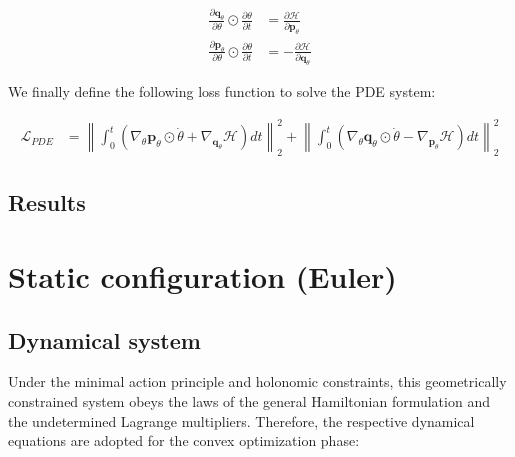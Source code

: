 \documentclass[draft]{agujournal2019}
\newcommand{\norm}[1]{\left\lVert#1\right\rVert}
\begin{document}
\begin{align}
    \frac{\partial \mathbf{q}_\theta}{\partial \theta} \odot \frac{\partial \theta}{\partial t} &= \frac{\partial \mathcal{H}}{\partial \mathbf{p}_\theta} \\
    \frac{\partial \mathbf{p}_\theta}{\partial \theta} \odot \frac{\partial \theta}{\partial t} &= - \frac{\partial \mathcal{H}}{\partial \mathbf{q}_\theta}
\end{align}

We finally define the following loss function to solve the PDE system:

\begin{align}
    \mathcal{L}_{PDE} &= \norm{\int_0^t \left(\nabla_\theta \mathbf{p}_\theta \odot \dot{\theta} + \nabla_{\mathbf{q}_\theta} \mathcal{H}\right) dt}_2^2 + \norm{\int_0^t \left(\nabla_\theta \mathbf{q}_\theta \odot \dot{\theta} - \nabla_{\mathbf{p}_\theta} \mathcal{H}\right) dt}^2_2
\end{align}

\subsection{Results}

\section{Static configuration (Euler)}
\subsection{Dynamical system}
Under the minimal action principle and holonomic constraints, this geometrically constrained system obeys the laws of the general Hamiltonian formulation and the undetermined Lagrange multipliers. Therefore, the respective dynamical equations are adopted for the convex optimization phase:
\end{document}

